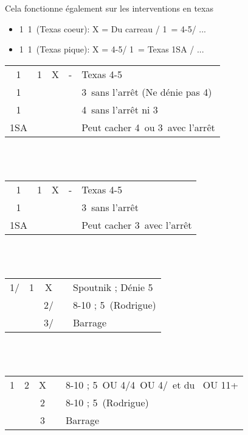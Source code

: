 \documentclass[a4paper, oneside, 11pt]{report}
\begin{document}
		Cela fonctionne également sur les interventions en texas
		\begin{itemize}
		\item 1\trefle\ 1\carreau\ (Texas coeur): X = Du carreau / 1\coeur\ = 4-5\pique / ...
		\item 1\trefle\ 1\coeur\ (Texas pique): X = 4-5\coeur / 1\pique\ = Texas 1SA / ...\\
		\end{itemize}

		\begin{tabular}{cccc|l}
		1\trefle & 1\carreau & X & - & Texas 4-5\coeur\\
		1\coeur &&&& 3\coeur\ sans l'arrêt (Ne dénie pas 4\pique)\\
		1\pique &&&& 4\pique\ sans l'arrêt ni 3\coeur\\
		1SA &&&& Peut cacher 4\pique\ ou 3\coeur\ avec l'arrêt \carreau\\
		\end{tabular}\\\\

		\begin{tabular}{cccc|l}
		1\trefle & 1\coeur & X & - & Texas 4-5\pique\\
		1\pique &&&& 3\pique\ sans l'arrêt\\
		1SA &&&& Peut cacher 3\pique\ avec l'arrêt \coeur\\
		\end{tabular}\\\\
		
		\begin{tabular}{cccc|l}
		1\trefle/\carreau & 1\pique & X && Spoutnik ; Dénie 5\coeur\\
		&& 2\trefle/\carreau && 8-10 ; 5\coeur\ (Rodrigue)\\
		&& 3\trefle/\carreau && Barrage\\
		\end{tabular}\\\\

		\begin{tabular}{cccc|l}
		1\carreau & 2\trefle & X && 8-10 ; 5\pique\ OU 4\coeur/4\pique\ OU 4\coeur/\pique\ et du \carreau\ OU 11+\\
		&& 2\carreau && 8-10 ; 5\coeur\ (Rodrigue)\\
		&& 3\carreau && Barrage\\
		\end{tabular}\\\\
\end{document}
